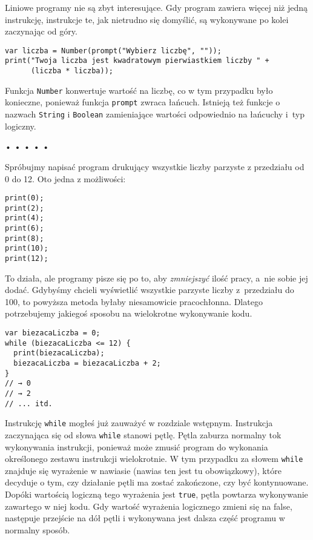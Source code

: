     
Liniowe programy nie są zbyt interesujące. Gdy program zawiera więcej niż jedną instrukcję, instrukcje te, jak nietrudno się domyślić, są wykonywane po kolei zaczynając od góry.

\begin{verbatim} 
var liczba = Number(prompt("Wybierz liczbę", ""));
print("Twoja liczba jest kwadratowym pierwiastkiem liczby " +
      (liczba * liczba));
\end{verbatim}
    
Funkcja \texttt{Number} konwertuje wartość na liczbę, co w tym przypadku było konieczne, ponieważ funkcja \texttt{prompt} zwraca łańcuch. Istnieją też funkcje o nazwach \texttt{String} i \texttt{Boolean} zamieniające wartości odpowiednio na łańcuchy i~typ logiczny.

  
\begin{center}
• • • • •
\end{center}
  
    
Spróbujmy napisać program drukujący wszystkie liczby parzyste z przedziału od 0 do 12. Oto jedna z możliwości:

\begin{verbatim} 
print(0);
print(2);
print(4);
print(6);
print(8);
print(10);
print(12);
\end{verbatim}
    
To działa, ale programy pisze się po to, aby \emph{zmniejszyć} ilość pracy, a~nie sobie jej dodać. Gdybyśmy chcieli wyświetlić wszystkie parzyste liczby z~przedziału do 100, to powyższa metoda byłaby niesamowicie pracochłonna. Dlatego potrzebujemy jakiegoś sposobu na wielokrotne wykonywanie kodu.

\begin{verbatim} 
var biezacaLiczba = 0;
while (biezacaLiczba <= 12) {
  print(biezacaLiczba);
  biezacaLiczba = biezacaLiczba + 2;
}
// → 0
// → 2
// ... itd.
\end{verbatim}
    
Instrukcję \texttt{while} mogłeś już zauważyć w rozdziale wstępnym. Instrukcja zaczynająca się od słowa \texttt{while} stanowi pętlę. Pętla zaburza normalny tok wykonywania instrukcji, ponieważ może zmusić program do wykonania określonego zestawu instrukcji wielokrotnie. W tym przypadku za słowem \texttt{while} znajduje się wyrażenie w nawiasie (nawias ten jest tu obowiązkowy), które decyduje o tym, czy działanie pętli ma zostać zakończone, czy być kontynuowane. Dopóki wartością logiczną tego wyrażenia jest \texttt{true}, pętla powtarza wykonywanie zawartego w niej kodu. Gdy wartość wyrażenia logicznego zmieni się na false, następuje przejście na dół pętli i wykonywana jest dalsza część programu w normalny sposób.

